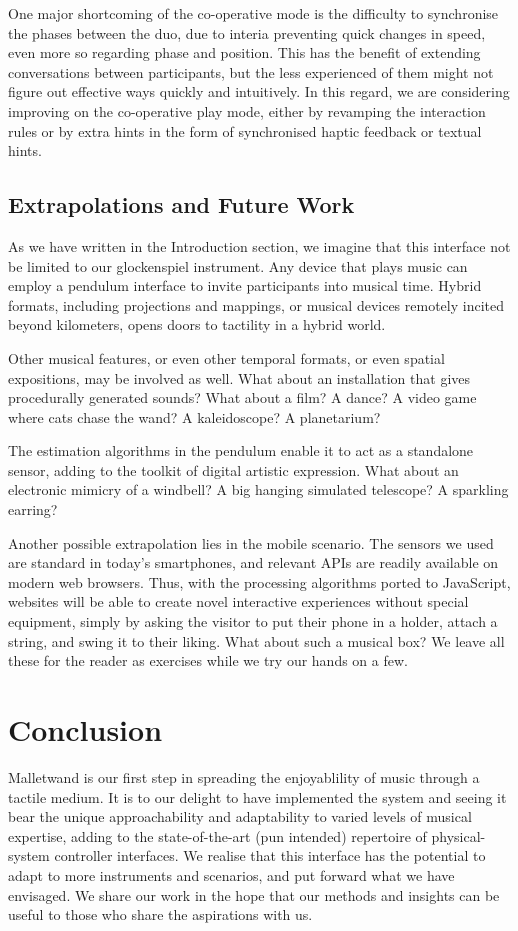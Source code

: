 \documentclass{nime-alternate} %
\begin{document}
One major shortcoming of the co-operative mode is the difficulty to synchronise the phases between the duo, due to interia preventing quick changes in speed, even more so regarding phase and position. This has the benefit of extending conversations between participants, but the less experienced of them might not figure out effective ways quickly and intuitively. In this regard, we are considering improving on the co-operative play mode, either by revamping the interaction rules or by extra hints in the form of synchronised haptic feedback or textual hints.

\subsection{Extrapolations and Future Work}
As we have written in the Introduction section, we imagine that this interface not be limited to our glockenspiel instrument. Any device that plays music can employ a pendulum interface to invite participants into musical time. Hybrid formats, including projections and mappings, or musical devices remotely incited beyond kilometers, opens doors to tactility in a hybrid world.

Other musical features, or even other temporal formats, or even spatial expositions, may be involved as well. What about an installation that gives procedurally generated sounds? What about a film? A dance? A video game where cats chase the wand? A kaleidoscope? A planetarium?

The estimation algorithms in the pendulum enable it to act as a standalone sensor, adding to the toolkit of digital artistic expression. What about an electronic mimicry of a windbell? A big hanging simulated telescope? A sparkling earring?

Another possible extrapolation lies in the mobile scenario. The sensors we used are standard in today's smartphones, and relevant APIs are readily available on modern web browsers. Thus, with the processing algorithms ported to JavaScript, websites will be able to create novel interactive experiences without special equipment, simply by asking the visitor to put their phone in a holder, attach a string, and swing it to their liking. What about such a musical box? We leave all these for the reader as exercises while we try our hands on a few.

\section{Conclusion}
Malletwand is our first step in spreading the enjoyablility of music through a tactile medium. It is to our delight to have implemented the system and seeing it bear the unique approachability and adaptability to varied levels of musical expertise, adding to the state-of-the-art (pun intended) repertoire of physical-system controller interfaces. We realise that this interface has the potential to adapt to more instruments and scenarios, and put forward what we have envisaged. We share our work in the hope that our methods and insights can be useful to those who share the aspirations with us.
\end{document}

